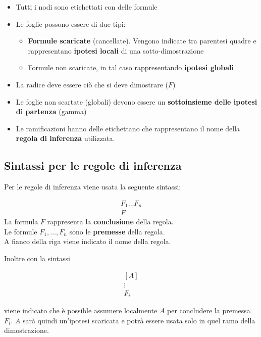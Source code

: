 \documentclass[
  a4paper,
]{article}
\providecommand{\tightlist}{%
  \setlength{\itemsep}{0pt}\setlength{\parskip}{0pt}}
\begin{document}
\begin{itemize}
\item
  Tutti i nodi sono etichettati con delle formule
\item
  Le foglie possono essere di due tipi:

  \begin{itemize}
  \tightlist
  \item
    \textbf{Formule scaricate} (cancellate). Vengono indicate tra
    parentesi quadre e rappresentano \textbf{ipotesi locali} di una
    sotto-dimostrazione
  \item
    Formule non scaricate, in tal caso rappresentando \textbf{ipotesi
    globali}
  \end{itemize}
\item
  La radice deve essere ciò che si deve dimostrare (\(F\))
\item
  Le foglie non scartate (globali) devono essere un \textbf{sottoinsieme
  delle ipotesi di partenza} (gamma)
\item
  Le ramificazioni hanno delle etichettano che rappresentano il nome
  della \textbf{regola di inferenza} utilizzata.
\end{itemize}

\hypertarget{sintassi-per-le-regole-di-inferenza}{%
\subsection{Sintassi per le regole di
inferenza}\label{sintassi-per-le-regole-di-inferenza}}

Per le regole di inferenza viene usata la seguente sintassi:

\[
\begin{matrix} 
F_1 \dots F_n \\
\hline
F
\end{matrix}
\] La formula \(F\) rappresenta la \textbf{conclusione} della regola.\\
Le formule \(F_1, \dots , F_n\) sono le \textbf{premesse} della
regola.\\
A fianco della riga viene indicato il nome della regola.

Inoltre con la sintassi

\[
\begin{matrix} 
[A] \\
\vdots \\
F_i
\end{matrix}
\]

viene indicato che è possible assumere localmente \(A\) per concludere
la premessa \(F_i\). \(A\) sarà quindi un'ipotesi scaricata e potrà
essere usata solo in quel ramo della dimostrazione.
\end{document}
